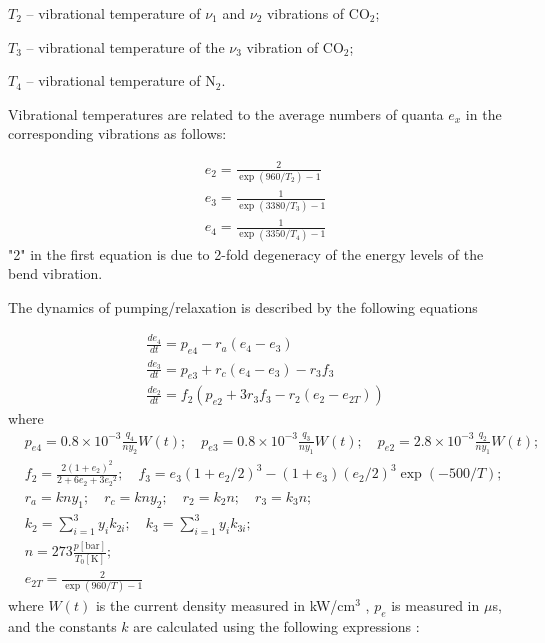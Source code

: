 \documentclass{report}
\begin{document}
$T_2$ – vibrational temperature of $\nu_1$ and $\nu_2$ vibrations of {CO$_2$};

$T_3$ – vibrational temperature of the $\nu_3$ vibration of {CO$_2$};

$T_4$ – vibrational temperature of {N$_2$}.

Vibrational temperatures are related to the average numbers of quanta $e_x$ in the corresponding vibrations as follows:

\begin{equation}\label{eq:e}
\begin{aligned}
&{e_2} = \frac{2}{\exp(960/{T_2})-1}\\
&{e_3} = \frac{1}{\exp(3380/{T_3})-1}\\
&{e_4} = \frac{1}{\exp(3350/{T_4})-1} 
\end{aligned}
\end{equation}
"2" in the first equation is due to 2-fold degeneracy of the energy levels of the bend vibration.

The dynamics of pumping/relaxation is described by the following equations

\begin{equation}\label{eq:dedt}
\begin{aligned}
&\frac{d e_4}{dt} = p_{e4} - r_a (e_4 - e_3)\\
&\frac{d e_3}{dt} = p_{e3} + r_c(e_4 - e_3) - r_3 f_3\\
&\frac{d e_2}{dt} = f_2 \left( p_{e2} + 3 r_3 f_3 - r_2 (e_2 - e_{2T}) \right)
\end{aligned}
\end{equation}
where
\begin{equation}
\begin{aligned}
&p_{e4} = 0.8\times 10^{-3} \frac{q_4}{n y_2} W(t);\quad p_{e3} = 0.8\times 10^{-3}\frac{q_3}{n y_1} W(t);\quad p_{e2} = 2.8\times 10^{-3}\frac{q_2}{n y_1} W(t);\\
&f_2 = \frac{2(1+e_2)^2}{2+6e_2+3{e_2}^2};\quad f_3 = e_3(1+e_2/2)^3 - (1+e_3)(e_2/2)^3 \exp(- 500/T);\\
&r_a = kny_1;\quad r_c = kny_2;\quad r_2 = k_2n;\quad r_3 = k_3n;\\
&k_2 = \sum\limits_{i=1}^3 y_i k_{2i};\quad k_3 = \sum\limits_{i=1}^3 y_i k_{3i};\\
&n = 273 \frac{p[\text{bar}]}{T_0[\text{K}]};\\
&e_{2T} = \frac{2}{\exp(960/T)-1}
\end{aligned}
\end{equation}
where $W(t)$ is the current density measured in {kW/cm$^3$} , $p_e$ is measured in {$\mu$s}, and the constants $k$ are calculated using the following expressions \cite{Biryukov-1974,Taylor-1969}:
\end{document}
